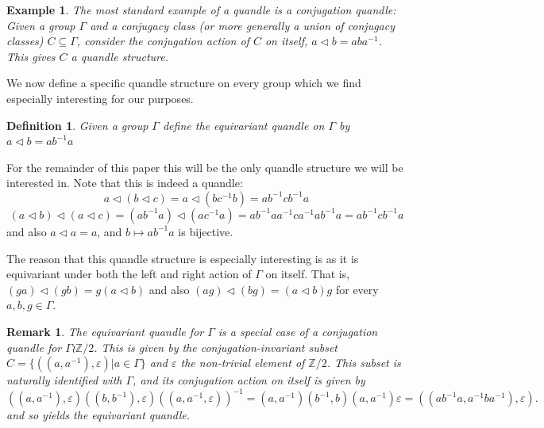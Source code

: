 \documentclass[letterpaper]{amsart}
\newtheorem{definition}[theorem]{Definition}
\newtheorem{example}[theorem]{Example}
\newtheorem{remark}[theorem]{Remark}
\begin{document}
\begin{example}
The most standard example of a quandle is a conjugation quandle:
Given a group $\Gamma$ and a conjugacy class (or more generally a union of conjugacy classes) $C \subseteq \Gamma$, consider the conjugation action of $C$ on itself, $a \lhd b = aba^{-1}$. This gives $C$ a quandle structure.
\end{example}

We now define a specific quandle structure on every group which we find especially interesting for our purposes.
\begin{definition}
    Given a group $\Gamma$ define the equivariant quandle on $\Gamma$ by $a \lhd b = ab^{-1}a$
\end{definition}
For the remainder of this paper this will be the only quandle structure we will be interested in.
Note that this is indeed a quandle:
$$a \lhd (b \lhd c) = a \lhd (bc^{-1}b) = ab^{-1}cb^{-1}a$$
$$(a \lhd b) \lhd (a \lhd c) = (ab^{-1}a) \lhd (ac^{-1}a) = ab^{-1}a a^{-1}ca^{-1} ab^{-1}a = ab^{-1}cb^{-1}a$$
and also $a \lhd a = a$, and $b \mapsto ab^{-1}a$ is bijective.

The reason that this quandle structure is especially interesting is as it is equivariant under both the left and right action of $\Gamma$ on itself. That is, $(ga) \lhd (gb) = g(a \lhd b)$ and also $(ag) \lhd (bg) = (a \lhd b)g$ for every $a,b,g\in \Gamma$.

\begin{remark}
\label{equivariant quandle is a special case of a conjugation quandle}
    The equivariant quandle for $\Gamma$ is a special case of a conjugation quandle for $\Gamma \wr \mathbb{Z}/2$. This is given by the conjugation-invariant subset $C = \{((a, a^{-1}), \varepsilon) | a \in \Gamma\}$ and $\varepsilon$ the non-trivial element of $\mathbb{Z}/2$. This subset is naturally identified with $\Gamma$, and its conjugation action on itself is given by $$((a,a^{-1}),\varepsilon) ((b,b^{-1}),\varepsilon) ((a,a^{-1},\varepsilon))^{-1} = (a,a^{-1})(b^{-1},b)(a,a^{-1})\varepsilon = ((ab^{-1}a, a^{-1}ba^{-1}), \varepsilon).$$
    and so yields the equivariant quandle.
\end{remark}
\end{document}
